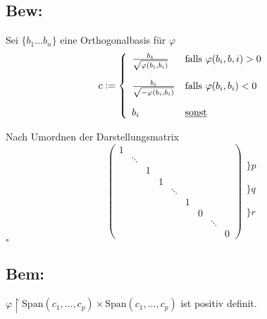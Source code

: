 \documentclass[titlepage,12pt,a4paper,ngerman]{report}
\newenvironment{bew}[1]{\subsection{Bew: #1}}{\hfill$\square$}
\newcommand{\Bew}[2]{\begin{bew}{#1}#2\end{bew}}
\newcommand{\tx}[1]{\textrm{#1}}
\begin{document}
\Bew{}{Sei $\{b_1 \dots b_n\}$ eine Orthogonalbasis für $\varphi$
	$$ c := \left \{ 
	\begin{array}{ll}
	\frac{b_1}{\sqrt{\varphi(b_i,b_i)}} & \tx{falls } \varphi(b_i,b,i) > 0\\[15pt]
	\frac{b_i}{\sqrt{-\varphi(b_i,b_i)}} & \tx{falls } \varphi(b_i,b_i) < 0\\[15pt]
	b_i & \tx{\underline{sonst}}
	\end{array}\right.$$
	
	Nach Umordnen der Darstellungsmatrix  
	$$\begin{pmatrix}
	1\\
	& \ddots\\
	& & 1\\
	& & &1\\
	& & & & \ddots\\
	& & & & & 1\\
	& & & & & & 0\\
	& & & & & & & \ddots\\
	& & & & & & & & 0
	\end{pmatrix} \begin{array}{ll}
	\\
	\bigg\} p\\
	\\
	\\
	\bigg\} q\\
	\\
	\\
	\bigg\} r\\
	\\
	\end{array}$$
}

\subsection*{Bem:}
$ \varphi \upharpoonright \tx{Span}(c_1,\dots,c_p) \times \tx{Span}(c_1,\dots,c_p) $ ist positiv definit.
\end{document}
